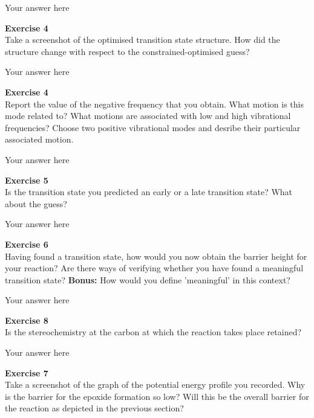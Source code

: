 \documentclass{article}
\begin{document}
Your answer here

\begin{mdframed}
\textbf{Exercise 4}\\
Take a screenshot of the optimised transition state structure. How did the structure change with respect to the constrained-optimised guess?
\end{mdframed}

Your answer here

\begin{mdframed}
\textbf{Exercise 4}\\
Report the value of the negative frequency that you obtain.  What motion is this mode related to?
What motions are associated with low and high vibrational frequencies? Choose two positive vibrational modes and desribe their particular associated motion.
\end{mdframed}

Your answer here

\begin{mdframed}
\textbf{Exercise 5}\\
Is the transition state you predicted an early or a late transition state? What about the guess?
\end{mdframed}

Your answer here

\begin{mdframed}
\textbf{Exercise 6}\\
Having found a transition state, how would you now obtain the barrier height for your reaction? Are there ways of verifying whether you have found a meaningful
transition state? \textbf{Bonus:} How would you define 'meaningful' in
this context?
\end{mdframed}

Your answer here

\begin{mdframed}
\textbf{Exercise 8}\\
Is the stereochemistry at the carbon at which the reaction takes
place retained?
\end{mdframed}

Your answer here

\begin{mdframed}
\textbf{Exercise 7}\\
Take a screenshot of the graph of the potential energy profile you
recorded.
Why is the barrier for the epoxide formation so low? Will this be
the overall barrier for the reaction as depicted in the previous section?
\end{mdframed}
\end{document}
